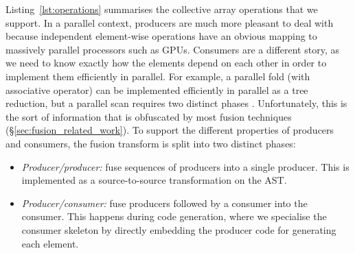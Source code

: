 Listing~\ref{lst:operations} summarises the collective array operations that we
support. In a parallel context, producers are much more pleasant to deal with
because independent element-wise operations have an obvious mapping to massively
parallel processors such as GPUs. Consumers are
a different story, as we need to know exactly how the elements depend on each
other in order to implement them efficiently in parallel. For example, a
parallel fold (with associative operator) can be implemented efficiently in
parallel as a tree reduction, but a parallel scan requires two distinct phases
\cite{Chatterjee:1990vj,Sengupta:2007tc}. Unfortunately, this is the sort of
information that is obfuscated by most fusion techniques
(\S\ref{sec:fusion_related_work}). To support the different properties of
producers and consumers, the fusion transform is split into two distinct phases:
%
\begin{itemize}
    \item \emph{Producer/producer:} fuse sequences of producers into a single
        producer. This is implemented as a source-to-source transformation on
        the AST.

    \item \emph{Producer/consumer:} fuse producers followed by a consumer into
        the consumer. This happens during code generation, where we specialise
        the consumer skeleton by directly embedding the producer code for
        generating each element.
\end{itemize}

